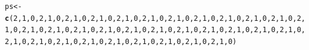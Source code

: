 \documentclass{article}\usepackage[]{graphicx}\usepackage[]{color}
\makeatletter
\newcommand{\hlnum}[1]{\textcolor[rgb]{0.686,0.059,0.569}{#1}}%
\newcommand{\hlstd}[1]{\textcolor[rgb]{0.345,0.345,0.345}{#1}}%
\newcommand{\hlkwb}[1]{\textcolor[rgb]{0.69,0.353,0.396}{#1}}%
\newcommand{\hlkwd}[1]{\textcolor[rgb]{0.737,0.353,0.396}{\textbf{#1}}}%
\newenvironment{kframe}{%
 \def\at@end@of@kframe{}%
 \ifinner\ifhmode%
  \def\at@end@of@kframe{\end{minipage}}%
  \begin{minipage}{\columnwidth}%
 \fi\fi%
 \def\FrameCommand##1{\hskip\@totalleftmargin \hskip-\fboxsep
 \colorbox{shadecolor}{##1}\hskip-\fboxsep
     \hskip-\linewidth \hskip-\@totalleftmargin \hskip\columnwidth}%
 \MakeFramed {\advance\hsize-\width
   \@totalleftmargin\z@ \linewidth\hsize
   \@setminipage}}%
 {\par\unskip\endMakeFramed%
 \at@end@of@kframe}
\newenvironment{knitrout}{}{} %
\makeatother
\begin{document}
\begin{knitrout}
\color{fgcolor}\begin{kframe}
\begin{alltt}
\hlstd{ps} \hlkwb{<-} \hlkwd{c}\hlstd{(}\hlnum{2}\hlstd{,}\hlnum{1}\hlstd{,}\hlnum{0}\hlstd{,}\hlnum{2}\hlstd{,}\hlnum{1}\hlstd{,}\hlnum{0}\hlstd{,}\hlnum{2}\hlstd{,}\hlnum{1}\hlstd{,}\hlnum{0}\hlstd{,}\hlnum{2}\hlstd{,}\hlnum{1}\hlstd{,}\hlnum{0}\hlstd{,}\hlnum{2}\hlstd{,}\hlnum{1}\hlstd{,}\hlnum{0}\hlstd{,}\hlnum{2}\hlstd{,}\hlnum{1}\hlstd{,}\hlnum{0}\hlstd{,}\hlnum{2}\hlstd{,}\hlnum{1}\hlstd{,}\hlnum{0}\hlstd{,}\hlnum{2}\hlstd{,}\hlnum{1}\hlstd{,}\hlnum{0}\hlstd{,}\hlnum{2}\hlstd{,}\hlnum{1}\hlstd{,}\hlnum{0}\hlstd{,}\hlnum{2}\hlstd{,}\hlnum{1}\hlstd{,}\hlnum{0}\hlstd{,}\hlnum{2}\hlstd{,}\hlnum{1}\hlstd{,}\hlnum{0}\hlstd{,}\hlnum{2}\hlstd{,}\hlnum{1}\hlstd{,}\hlnum{0}\hlstd{,}\hlnum{2}\hlstd{,}\hlnum{1}\hlstd{,}\hlnum{0}\hlstd{,}\hlnum{2}\hlstd{,}\hlnum{1}\hlstd{,}\hlnum{0}\hlstd{,}\hlnum{2}\hlstd{,}\hlnum{1}\hlstd{,}\hlnum{0}\hlstd{,}\hlnum{2}\hlstd{,}\hlnum{1}\hlstd{,}\hlnum{0}\hlstd{,}\hlnum{2}\hlstd{,}\hlnum{1}\hlstd{,}\hlnum{0}\hlstd{,}\hlnum{2}\hlstd{,}\hlnum{1}\hlstd{,}\hlnum{0}\hlstd{,}\hlnum{2}\hlstd{,}\hlnum{1}\hlstd{,}\hlnum{0}\hlstd{,}\hlnum{2}\hlstd{,}\hlnum{1}\hlstd{,}\hlnum{0}\hlstd{,}\hlnum{2}\hlstd{,}\hlnum{1}\hlstd{,}\hlnum{0}\hlstd{,}\hlnum{2}\hlstd{,}\hlnum{1}\hlstd{,}\hlnum{0}\hlstd{,}\hlnum{2}\hlstd{,}\hlnum{1}\hlstd{,}\hlnum{0}\hlstd{,}\hlnum{2}\hlstd{,}\hlnum{1}\hlstd{,}\hlnum{0}\hlstd{,}\hlnum{2}\hlstd{,}\hlnum{1}\hlstd{,}\hlnum{0}\hlstd{,}\hlnum{2}\hlstd{,}\hlnum{1}\hlstd{,}\hlnum{0}\hlstd{,}\hlnum{2}\hlstd{,}\hlnum{1}\hlstd{,}\hlnum{0}\hlstd{,}\hlnum{2}\hlstd{,}\hlnum{1}\hlstd{,}\hlnum{0}\hlstd{,}\hlnum{2}\hlstd{,}\hlnum{1}\hlstd{,}\hlnum{0}\hlstd{,}\hlnum{2}\hlstd{,}\hlnum{1}\hlstd{,}\hlnum{0}\hlstd{,}\hlnum{2}\hlstd{,}\hlnum{1}\hlstd{,}\hlnum{0}\hlstd{,}\hlnum{2}\hlstd{,}\hlnum{1}\hlstd{,}\hlnum{0}\hlstd{)}

\end{alltt}
\end{kframe}
\end{knitrout}
\end{document}
